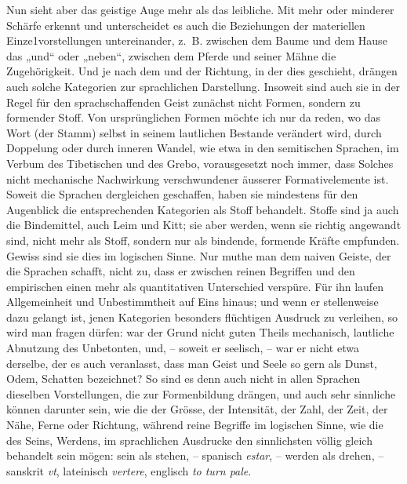 Nun sieht aber das geistige Auge mehr als das leibliche. Mit mehr oder minderer Schärfe erkennt und unterscheidet es auch die Beziehungen der materiellen Einze1vorstellungen untereinander, z.~B. zwischen dem Baume und dem Hause das „und“ oder „neben“, zwischen dem Pferde und seiner Mähne die Zugehörigkeit. Und je nach dem  und der Richtung, in der dies geschieht, drängen auch solche Kategorien zur sprachlichen Darstellung. Insoweit sind auch sie in der \label{sp.326} Regel für den sprachschaffenden Geist zunächst nicht Formen, sondern zu formender \label{fp.318} Stoff. Von ursprünglichen Formen möchte ich nur da reden, wo das Wort (der Stamm) selbst in seinem lautlichen Bestande verändert wird, durch Doppelung oder durch inneren Wandel, wie etwa in den semitischen Sprachen, im Verbum des Tibetischen und des Grebo, vorausgesetzt noch immer, dass Solches nicht mechanische Nachwirkung verschwundener äusserer Formativelemente ist. Soweit die Sprachen dergleichen geschaffen, haben sie mindestens für den Augenblick die entsprechenden Kategorien als Stoff behandelt. Stoffe sind ja auch die Bindemittel, auch Leim und Kitt; sie aber werden, wenn sie richtig angewandt sind, nicht mehr als Stoff, sondern nur als bindende, formende Kräfte empfunden. Gewiss sind sie dies im logischen Sinne. Nur muthe man dem naiven Geiste, der die Sprachen schafft, nicht zu, dass er zwischen reinen Begriffen und den empirischen einen mehr als quantitativen Unterschied verspüre. Für ihn laufen Allgemeinheit und Unbestimmtheit auf Eins hinaus; und wenn er stellenweise dazu gelangt ist, jenen Kategorien besonders flüchtigen Ausdruck zu verleihen, so wird man fragen dürfen: war der Grund nicht guten Theils mechanisch, lautliche Abnutzung des Unbetonten, und, – soweit er seelisch, – war er nicht etwa derselbe, der es auch veranlasst, dass \label{fp.188} man Geist und Seele so gern als Dunst, Odem, Schatten bezeichnet? So sind es denn auch nicht in allen Sprachen dieselben Vorstellungen, die zur Formenbildung drängen, und auch sehr sinnliche können darunter sein, wie die der Grösse, der Intensität, der Zahl, der Zeit, der Nähe, Ferne oder Richtung, während reine Begriffe im logischen Sinne, wie die des Seins, Werdens, im sprachlichen Ausdrucke den sinnlichsten völlig gleich behandelt sein mögen: sein als stehen, – spanisch \textit{estar},  – werden als drehen, – sanskrit \textit{vt}, lateinisch \textit{vertere}, englisch \textit{to turn pale}.

